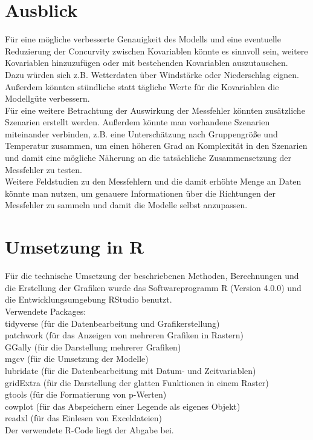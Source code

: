 \documentclass[12pt]{scrreprt}
\begin{document}
\chapter{Ausblick}
Für eine mögliche verbesserte Genauigkeit des Modells und eine eventuelle Reduzierung der Concurvity zwischen Kovariablen könnte es sinnvoll sein, weitere Kovariablen hinzuzufügen oder  mit bestehenden Kovariablen auszutauschen. Dazu würden sich z.B. Wetterdaten über Windstärke oder Niederschlag eignen. Außerdem könnten stündliche statt tägliche Werte für die Kovariablen die Modellgüte verbessern. \\
Für eine weitere Betrachtung der Auswirkung der Messfehler könnten zusätzliche Szenarien erstellt werden. Außerdem könnte man vorhandene Szenarien miteinander verbinden, z.B. eine Unterschätzung nach Gruppengröße und Temperatur zusammen, um einen höheren Grad an Komplexität in den Szenarien und damit eine mögliche Näherung an die tatsächliche Zusammensetzung der Messfehler zu testen. \\
Weitere Feldstudien zu den Messfehlern und die damit erhöhte Menge an Daten könnte man nutzen, um genauere Informationen über die Richtungen der Messfehler zu sammeln und damit die Modelle selbst anzupassen.


	

\chapter{Umsetzung in R}
Für die technische Umsetzung der beschriebenen Methoden, Berechnungen und die Erstellung der Grafiken wurde das Softwareprogramm R (Version 4.0.0) und die Entwicklungsumgebung RStudio benutzt.\\

\noindent Verwendete Packages:\\
tidyverse (für die Datenbearbeitung und Grafikerstellung) \\
patchwork (für das Anzeigen von mehreren Grafiken in Rastern) \\
GGally (für die Darstellung mehrerer Grafiken) \\
mgcv (für die Umsetzung der Modelle) \\
lubridate (für die Datenbearbeitung mit Datum- und Zeitvariablen) \\
gridExtra (für die Darstellung der glatten Funktionen in einem Raster) \\
gtools (für die Formatierung von p-Werten) \\
cowplot (für das Abspeichern einer Legende als eigenes Objekt) \\
readxl (für das Einlesen von Exceldateien) \\

\noindent Der verwendete R-Code liegt der Abgabe bei.
\end{document}
